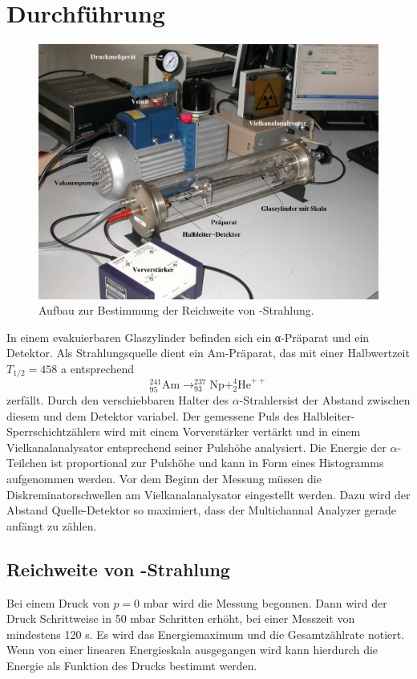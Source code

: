 \section{Durchführung}
\label{sec:Durchführung}

\begin{figure}
  \centering
  \includegraphics{data/abb1.png}
  \caption{Aufbau zur Bestimmung der Reichweite von \alpha-Strahlung.}
  \label{fig:abbA1}
\end{figure}
\FloatBarrier

In einem evakuierbaren Glaszylinder befinden sich ein α-Präparat und ein Detektor. 
Als Strahlungsquelle dient ein Am-Präparat, das mit einer Halbwertzeit $T_{1/2} = 458$ a entsprechend
\begin{equation}
    _{95}^{241}\text{Am} \longrightarrow _{93}^{237}\text{Np} + _{2}^{4}\text{He}^{++}
    \label{eqn:gl4}
\end{equation}
zerfällt.
Durch den verschiebbaren Halter des $\alpha$-Strahlersist der Abstand zwischen diesem und dem Detektor variabel.
Der gemessene Puls des Halbleiter-Sperrschichtzählers wird mit einem Vorverstärker vertärkt und in einem Vielkanalanalysator entsprechend seiner Pulshöhe analysiert.
Die Energie der $\alpha$-Teilchen ist proportional zur Pulshöhe und kann in Form eines Histogramms aufgenommen werden.
Vor dem Beginn der Messung müssen  die Diskreminatorschwellen am Vielkanalanalysator eingestellt werden.
Dazu wird der Abstand Quelle-Detektor so maximiert, dass der Multichannal Analyzer gerade anfängt zu zählen.

\subsection{Reichweite von \alpha-Strahlung}
Bei einem Druck von $p = 0$ mbar wird die Messung begonnen.
Dann wird der Druck Schrittweise in 50 mbar Schritten erhöht, bei einer Messzeit von mindestens 120 s.
Es wird das Energiemaximum und die Gesamtzählrate notiert.
Wenn von einer linearen Energieskala ausgegangen wird kann hierdurch die Energie als Funktion des Drucks bestimmt werden.

